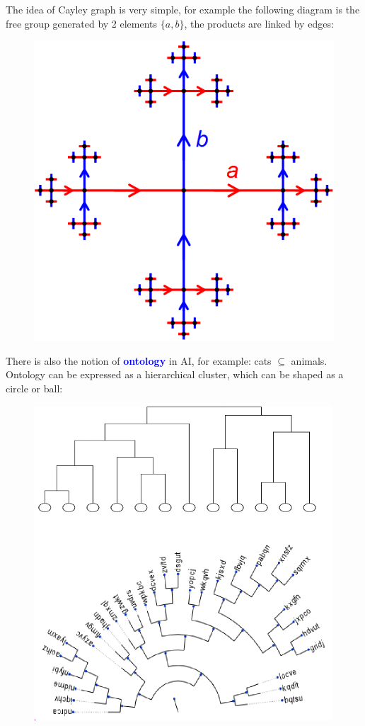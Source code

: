 \documentclass[12pt]{article}
\newcommand{\concept}[1]{\textbf{\textcolor{blue}{#1}}}
\newcommand{\formula}[1]{\textcolor{LogicColor}{#1}}
\begin{document}
The idea of Cayley graph is very simple, for example the following diagram is the free group generated by 2 elements $\{ a, b \}$, the products are linked by edges:
\begin{figure}[H]
\centering
\includegraphics[scale=0.25]{cayley-graph.jpg}
\end{figure}

There is also the notion of \concept{ontology} in AI, for example: \formula{cats $\subseteq$ animals}.  Ontology can be expressed as a hierarchical cluster, which can be shaped as a circle or ball:
\begin{figure}[H]
\centering
\includegraphics[scale=0.5]{ontology-ball.png}
\end{figure}
\end{document}
